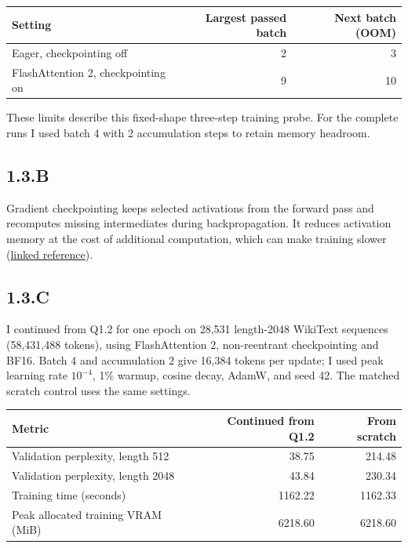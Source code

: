 \documentclass{article}
\begin{document}
\begin{center}
\begin{tabular}{lrr}
\toprule
Setting & Largest passed batch & Next batch (OOM) \\
\midrule
Eager, checkpointing off & 2 & 3 \\
FlashAttention 2, checkpointing on & 9 & 10 \\
\bottomrule
\end{tabular}
\end{center}

These limits describe this fixed-shape three-step training probe. For the complete runs I used batch 4 with 2 accumulation steps to retain memory headroom.

\subsection*{1.3.B}
Gradient checkpointing keeps selected activations from the forward pass and recomputes missing intermediates during backpropagation. It reduces activation memory at the cost of additional computation, which can make training slower (\href{https://github.com/cybertronai/gradient-checkpointing}{linked reference}).

\subsection*{1.3.C}
I continued from Q1.2 for one epoch on 28,531 length-2048 WikiText sequences (58,431,488 tokens), using FlashAttention 2, non-reentrant checkpointing and BF16. Batch 4 and accumulation 2 give 16,384 tokens per update; I used peak learning rate $10^{-4}$, 1\% warmup, cosine decay, AdamW, and seed 42. The matched scratch control uses the same settings.

\begin{center}
\begin{tabular}{lrr}
\toprule
Metric & Continued from Q1.2 & From scratch \\
\midrule
Validation perplexity, length 512 & 38.75 & 214.48 \\
Validation perplexity, length 2048 & 43.84 & 230.34 \\
Training time (seconds) & 1162.22 & 1162.33 \\
Peak allocated training VRAM (MiB) & 6218.60 & 6218.60 \\
\bottomrule
\end{tabular}
\end{center}
\end{document}
